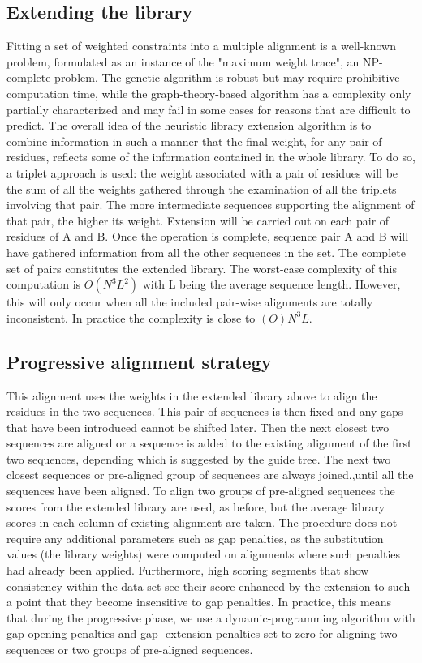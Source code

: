 \subsection{Extending the library}
Fitting a set of weighted constraints into a multiple alignment is a well-known problem, formulated as an instance of the "maximum weight trace", an NP-complete problem. The genetic algorithm is robust but may require prohibitive computation time, while the graph-theory-based algorithm has a complexity only partially characterized and may fail in some cases for reasons that are difficult to predict.
The overall idea of the heuristic library extension algorithm is to combine information in such a manner that the final weight, for any pair of residues, reflects some of the information contained in the whole library. To do so, a triplet approach is used: the weight associated with a pair of residues will be the sum of all the weights gathered through the examination of all the triplets involving that pair.
The more intermediate sequences supporting the alignment of that pair, the higher its weight.
Extension will be carried out on each pair of residues of A and B. Once the operation is complete, sequence pair A and B will have gathered information from all the other sequences in the set.  The complete set of pairs constitutes the extended library.
The worst-case complexity of this computation is $O(N^3L^2)$ with L being the average sequence length. However, this will only occur when all the included pair-wise alignments are totally inconsistent. In practice the complexity is close to $(O)N^3L$.

\subsection{Progressive alignment strategy}
This alignment uses the weights in the extended library above to align the residues in the two sequences. This pair of sequences is then fixed and any gaps that have been introduced cannot be shifted later. Then the next closest two sequences are aligned or a sequence is added to the existing alignment of the first two sequences, depending which is suggested by the guide tree. The next two closest sequences or pre-aligned group of sequences are always joined.,until all the sequences have been aligned.
To align two groups of pre-aligned sequences the scores from the extended library are used, as before, but the average library scores in each column of existing alignment are taken.
The procedure does not require any additional parameters such as gap penalties, as the substitution values (the library weights) were computed on alignments where such penalties had already been applied.  Furthermore, high scoring segments that show consistency within the data set see their score enhanced by the extension to such a point that they become insensitive to gap penalties. In practice, this means that during the progressive phase, we use a dynamic-programming algorithm with gap-opening penalties and gap- extension penalties set to zero for aligning two sequences or two groups of pre-aligned sequences.

